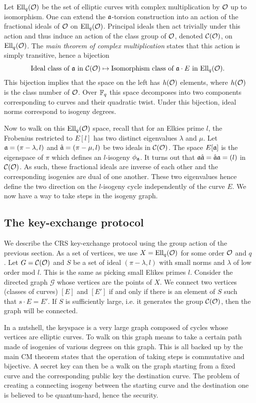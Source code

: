 \documentclass[../main/main.tex]{subfiles}
\begin{document}
Let $\text{Ell}_q(\mathcal{O})$ be the set of elliptic curves with complex multiplication by $\mathcal{O}$ up to isomorphism.
One can extend the $\mathfrak{a}$-torsion construction into an action of the fractional ideals of $\mathcal{O}$ on $\text{Ell}_q(\mathcal{O})$.
Principal ideals then act trivially under this action and thus induce an action of the class group of $\mathcal{O}$, denoted $\mathcal{C}(\mathcal{O})$, on $\text{Ell}_q(\mathcal{O})$.
The \textit{main theorem of complex multiplication} states that this action is simply transitive, hence a bijection
\[
	\text{Ideal class of }\mathfrak{a}\text{ in }\mathcal{C}(\mathcal{O}) \mapsto \text{Isomorphism class of } \mathfrak{a}\cdot E\text{ in } \text{Ell}_q(\mathcal{O}).
\]
This bijection implies that the space on the left has $h(\mathcal{O})$ elements, where $h(\mathcal{O})$ is the class number of $\mathcal{O}$.
Over $\mathbb{F}_q$ this space decomposes into two components corresponding to curves and their quadratic twist.
Under this bijection, ideal norms correspond to isogeny degrees.

Now to walk on this $\text{Ell}_q(\mathcal{O})$ space, recall that for an Elkies prime $l$, the Frobenius restricted to $E[l]$ has two distinct eigenvalues $\lambda$ and $\mu$.
Let $\mathfrak{a} = (\pi-\lambda, l)$ and $\hat{\mathfrak{a}} = (\pi-\mu, l)$ be two ideals in $\mathcal{C}(\mathcal{O})$.
The space $E[\mathfrak{a}]$ is the eigenspace of $\pi$ which defines an $l$-isogeny $\phi_{\mathfrak{a}}$.
It turns out that $\mathfrak{a}\hat{\mathfrak{a}} = \hat{\mathfrak{a}}\mathfrak{a} = (l)$ in $\mathcal{C}(\mathcal{O})$.
As such, these fractional ideals are inverse of each other and the corresponding isogenies are dual of one another.
These two eigenvalues hence define the two direction on the $l$-isogeny cycle independently of the curve $E$.
We now have a way to take steps in the isogeny graph.

\subsection{The key-exchange protocol}
We describe the CRS key-exchange protocol using the group action of the previous section.
As a set of vertices, we use $X=\text{Ell}_q(\mathcal{O})$ for some order $\mathcal{O}$ and $q$.
Let $G=\mathcal{C}(\mathcal{O})$ and $S$ be a set of ideal $(\pi-\lambda, l)$ with small norms and $\lambda$ of low order mod $l$.
This is the same as picking small Elikes primes $l$.
Consider the directed graph $\mathcal{G}$ whose vertices are the points of $X$.
We connect two vertices (classes of curves) $[E]$ and $[E']$  if and only if there is an element of $S$ such that $s\cdot E = E'$.
If $S$ is sufficiently large, i.e. it generates the group $\mathcal{C}(\mathcal{O})$, then the graph will be connected.

In a nutshell, the keyspace is a very large graph composed of cycles whose vertices are elliptic curves.
To walk on this graph means to take a certain path made of isogenies of various degrees on this graph.
This is all backed up by the main CM theorem states that the operation of taking steps is commutative and bijective.
A secret key can then be a walk on the graph starting from a fixed curve and the corresponding public key the destination curve.
The problem of creating a connecting isogeny between the starting curve and the destination one is believed to be quantum-hard, hence the security.
\end{document}
